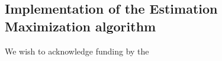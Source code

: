 \documentclass[%
 reprint,
 amsmath,amssymb,
 aps,
]{revtex4-1}
\begin{document}
\subsection{Implementation of the Estimation Maximization algorithm}
\begin{acknowledgments}
We wish to acknowledge funding by the 
\end{acknowledgments}
\end{document}
